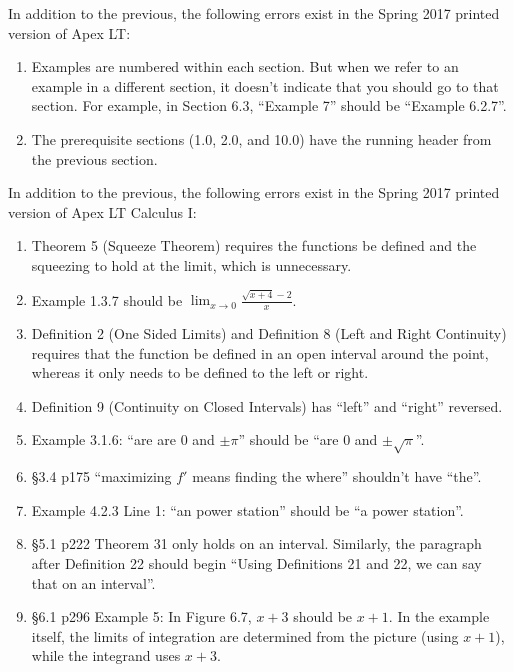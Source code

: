 \documentclass{amsart}
\newcommand{\ds}{\displaystyle}
\begin{document}

\newcommand{\springerrors}{%
In addition to the previous, the following errors exist in the Spring 2017 printed version of Apex LT:
\begin{enumerate}
\item Examples are numbered within each section.  But when we refer to an example in a different section, it doesn't indicate that you should go to that section.  For example, in Section 6.3, ``Example 7'' should be ``Example 6.2.7''.
\item The prerequisite sections (1.0, 2.0, and 10.0) have the running header from the previous section.
\end{enumerate}} %

\springerrors

In addition to the previous, the following errors exist in the Spring 2017 printed version of Apex LT Calculus I:
\begin{enumerate}
\item Theorem 5 (Squeeze Theorem) requires the functions be defined and the squeezing to hold at the limit, which is unnecessary.\vspace{-.5\baselineskip}
\item Example 1.3.7 should be $\ds \lim_{x\to 0} \frac{\sqrt{x+4}-2}{x}$.
\item Definition 2 (One Sided Limits) and Definition 8 (Left and Right Continuity) requires that the function be defined in an open interval around the point, whereas it only needs to be defined to the left or right.
\item Definition 9 (Continuity on Closed Intervals) has ``left'' and ``right'' reversed.
\item Example 3.1.6: ``are are $0$ and $\pm\pi$'' should be ``are $0$ and $\pm\sqrt\pi$''.
\item \S3.4 p175 ``maximizing $f'$ means finding the where'' shouldn't have ``the''.
\item Example 4.2.3 Line 1: ``an power station'' should be ``a power station''.
\item \S5.1 p222 Theorem 31 only holds on an interval.  Similarly, the paragraph after Definition 22 should begin ``Using Definitions 21 and 22, we can say that on an interval''.
\item \S6.1 p296 Example 5: In Figure 6.7, $x+3$ should be $x+1$.  In the example itself, the limits of integration are determined from the picture (using $x+1$), while the integrand uses $x+3$.
\label{2017-01Iplus}
\end{enumerate}
\end{document}
